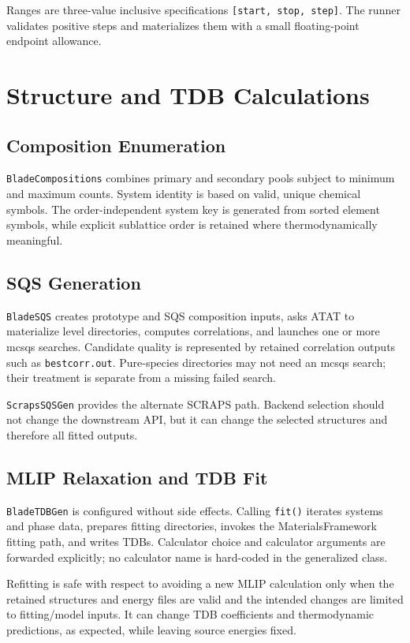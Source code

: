 \documentclass[11pt,letterpaper]{article}
\newcommand{\file}[1]{\nolinkurl{#1}}
\begin{document}
Ranges are three-value inclusive specifications \file{[start, stop, step]}.
The runner validates positive steps and materializes them with a small
floating-point endpoint allowance.

\section{Structure and TDB Calculations}

\subsection{Composition Enumeration}

\file{BladeCompositions} combines primary and secondary pools subject to
minimum and maximum counts. System identity is based on valid, unique chemical
symbols. The order-independent system key is generated from sorted element
symbols, while explicit sublattice order is retained where thermodynamically
meaningful.

\subsection{SQS Generation}

\file{BladeSQS} creates prototype and SQS composition inputs, asks ATAT to
materialize level directories, computes correlations, and launches one or
more mcsqs searches. Candidate quality is represented by retained correlation
outputs such as \file{bestcorr.out}. Pure-species directories may not need an
mcsqs search; their treatment is separate from a missing failed search.

\file{ScrapsSQSGen} provides the alternate SCRAPS path. Backend selection
should not change the downstream API, but it can change the selected
structures and therefore all fitted outputs.

\subsection{MLIP Relaxation and TDB Fit}

\file{BladeTDBGen} is configured without side effects. Calling \file{fit()}
iterates systems and phase data, prepares fitting directories, invokes the
MaterialsFramework fitting path, and writes TDBs. Calculator choice and
calculator arguments are forwarded explicitly; no calculator name is
hard-coded in the generalized class.

Refitting is safe with respect to avoiding a new MLIP calculation only when
the retained structures and energy files are valid and the intended changes
are limited to fitting/model inputs. It can change TDB coefficients and
thermodynamic predictions, as expected, while leaving source energies fixed.
\end{document}
